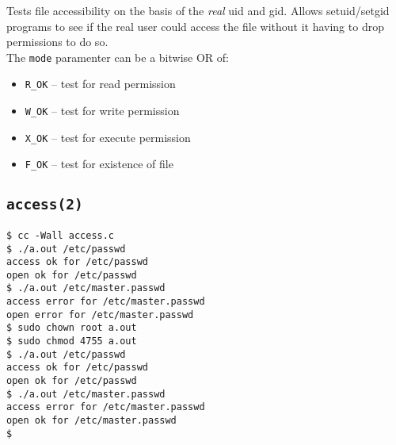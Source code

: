 \documentclass[xga]{xdvislides}
\begin{document}
Tests file accessibility on the basis of the {\em real} uid and gid. Allows
setuid/setgid programs to see if the real user could access the file without
it having to drop permissions to do so.
\\

The {\tt mode} paramenter can be a bitwise OR of:

\begin{itemize}
	\item {\tt R\_OK} -- test for read permission
	\item {\tt W\_OK} -- test for write permission
	\item {\tt X\_OK} -- test for execute permission
	\item {\tt F\_OK} -- test for existence of file
\end{itemize}

\subsection{{\tt access(2)}}
\begin{verbatim}
$ cc -Wall access.c
$ ./a.out /etc/passwd
access ok for /etc/passwd
open ok for /etc/passwd
$ ./a.out /etc/master.passwd
access error for /etc/master.passwd
open error for /etc/master.passwd
$ sudo chown root a.out
$ sudo chmod 4755 a.out
$ ./a.out /etc/passwd
access ok for /etc/passwd
open ok for /etc/passwd
$ ./a.out /etc/master.passwd
access error for /etc/master.passwd
open ok for /etc/master.passwd
$
\end{verbatim}
\end{document}
